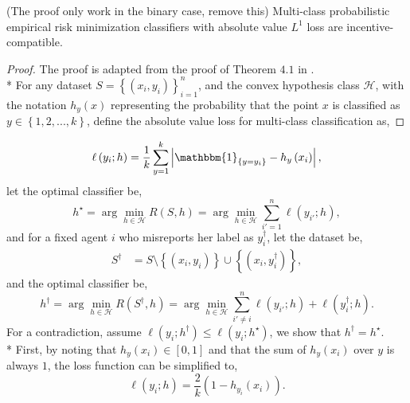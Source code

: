 \documentclass{article}
\begin{document}
\begin{prop} \label{prop:dfp} 
(The proof only work in the binary case, remove this) Multi-class probabilistic empirical risk minimization classifiers with absolute value $L^{1}$ loss are incentive-compatible.
\end{prop}
\begin{proof} \label{proof:dfppf} 
The proof is adapted from the proof of Theorem $4.1$ in \citet*{dekel2010incentive}.
\\* For any dataset $S  = \left\{\left(x_{i}, y_{i}\right)\right\}_{i=1}^{n}$, and the convex hypothesis class $\mathcal{H}$, with the notation $h_{y}\left(x\right)$ representing the probability that the point $x $ is classified as $y  \in \left\{1, 2, ..., k\right\}$, define the absolute value loss for multi-class classification as,
\end{proof}
\begin{equation} 
\ell\left(y_{i} ; h\right) = \dfrac{1}{k} \displaystyle\sum_{y=1}^{k} \left| \mathbbm{1}_{\left\{y = y_{i}\right\}} - h_{y}\left(x_{i}\right) \right|,
\end{equation}
let the optimal classifier be,
\begin{equation} 
h^\star  = \arg\displaystyle\min_{h \in \mathcal{H}} R\left(S, h\right) = \arg\displaystyle\min_{h \in \mathcal{H}} \displaystyle\sum_{i'=1}^{n} \ell\left(y_{i'} ; h\right),
\end{equation}
and for a fixed agent $i $ who misreports her label as $y^{\dagger}_{i}$, let the dataset be,
\begin{align*}
S^{\dagger} &= S \setminus  \left\{\left(x_{i}, y_{i}\right)\right\} \cup \left\{\left(x_{i}, y^{\dagger}_{i}\right)\right\},
\end{align*}
and the optimal classifier be,
\begin{equation} 
h^{\dagger} = \arg\displaystyle\min_{h \in \mathcal{H}} R\left(S^{\dagger}, h\right) = \arg\displaystyle\min_{h \in \mathcal{H}} \displaystyle\sum_{i' \neq  i}^{n} \ell\left(y_{i'} ; h\right) + \ell\left(y^{\dagger}_{i} ; h\right).
\end{equation}
For a contradiction, assume $\ell\left(y_{i}; h^{\dagger}\right) \leq  \ell\left(y_{i}; h^\star \right)$, we show that $h^{\dagger} = h^\star $.
\\* First, by noting that $h_{y}\left(x_{i}\right) \in \left[0, 1\right]$ and that the sum of $h_{y}\left(x_{i}\right)$ over $y $ is always $1$, the loss function can be simplified to,
\begin{equation} 
\ell\left(y_{i} ; h\right) = \dfrac{2}{k} \left(1 - h_{y_{i}}\left(x_{i}\right)\right).
\end{equation}
\end{document}

